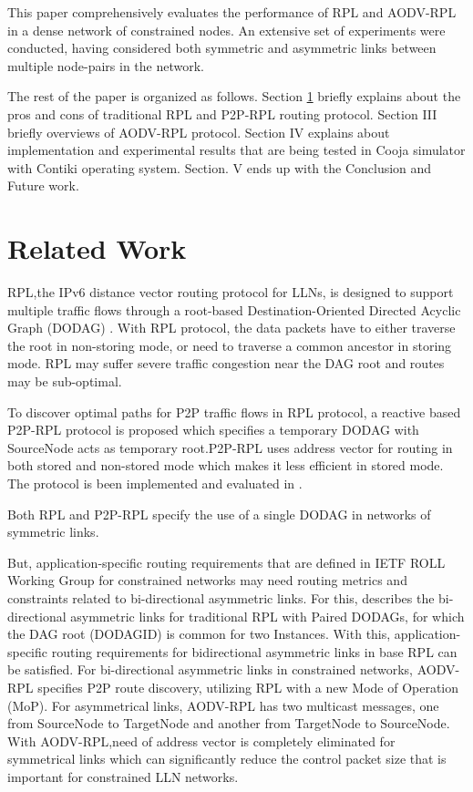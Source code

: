 \documentclass[conference, letterpaper]{IEEEtran}
\begin{document}
This paper comprehensively evaluates the performance of RPL and AODV-RPL in a
dense network of constrained nodes. An extensive set of experiments were
conducted, having considered both symmetric and asymmetric links between
multiple node-pairs in the network.

The rest of the paper is organized as follows. Section \ref{Section II} briefly
explains about the pros and cons of traditional RPL and P2P-RPL routing
protocol. Section III briefly overviews of AODV-RPL protocol. Section IV
explains about implementation and experimental results that are being tested in
Cooja simulator with Contiki operating system. Section. V ends up with the
Conclusion and Future work.

\section{Related Work}\label{Section II}

RPL,the IPv6 distance vector routing protocol for LLNs, is designed to
support multiple traffic flows through a root-based Destination-Oriented
Directed Acyclic Graph (DODAG) \cite{RFC6550}. With RPL protocol, the data
packets have to either traverse the root in non-storing mode, or need to
traverse a common ancestor in storing mode. RPL may suffer severe traffic
congestion near the DAG root \cite{RFC6997,RFC6998} and routes may be
sub-optimal.

To discover optimal paths for P2P traffic flows in RPL protocol, a
reactive based P2P-RPL \cite{RFC6997} protocol is proposed which specifies a
temporary DODAG with SourceNode acts as temporary root.P2P-RPL uses address
vector for routing in both stored and non-stored mode which makes it less
efficient in stored mode. The protocol is been implemented and evaluated in
\cite{6064397}.

Both RPL and P2P-RPL specify the use of a single DODAG in networks of symmetric links.

But, application-specific routing requirements that are defined in IETF
ROLL Working Group for constrained networks
\cite{RFC5548,RFC5673,RFC5826,RFC5867} may need routing metrics and constraints
related to bi-directional asymmetric links.  For this, \cite{RFC6549} describes
the bi-directional asymmetric links for traditional RPL with Paired DODAGs, for
which the DAG root (DODAGID) is common for two Instances. With this,
application-specific routing requirements for bidirectional asymmetric links in
base RPL can be satisfied. %
For bi-directional asymmetric links in constrained networks,
AODV-RPL specifies P2P route discovery, utilizing  RPL with a new Mode of
Operation (MoP).  For asymmetrical links, AODV-RPL has two multicast messages,
one from SourceNode to TargetNode and another from TargetNode to SourceNode.
With AODV-RPL,need of address vector is completely eliminated for symmetrical
links which can significantly reduce the control packet size that is important
for constrained LLN networks.
\end{document}
